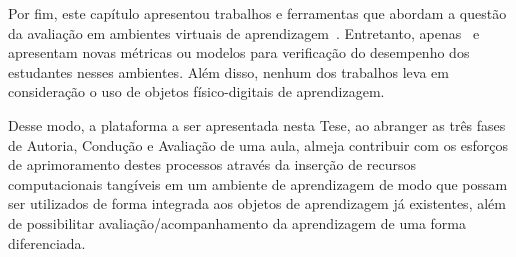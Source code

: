 Por fim, este capítulo apresentou trabalhos e ferramentas que abordam a questão da avaliação em ambientes virtuais de aprendizagem~\citep{Lucena:2015, Nunes:2016, Biswas:2007, sales:2012, sales:2019}. Entretanto, apenas~\cite{Biswas:2007} e~\cite{sales:2012} apresentam novas métricas ou modelos para verificação do desempenho dos estudantes nesses ambientes. Além disso, nenhum dos trabalhos leva em consideração o uso de objetos físico-digitais de aprendizagem.


Desse modo, a plataforma a ser apresentada nesta Tese, ao abranger as três fases de Autoria, Condução e Avaliação de uma aula, %
almeja contribuir com os esforços de aprimoramento destes processos através da inserção de recursos computacionais tangíveis em um ambiente de aprendizagem de modo que possam ser utilizados de forma integrada aos objetos de aprendizagem já existentes, além de possibilitar avaliação/acompanhamento da aprendizagem de uma forma diferenciada.